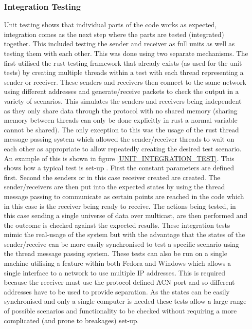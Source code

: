 \documentclass[11pt,a4paper]{article}
\begin{document}
\subsubsection{Integration Testing}
Unit testing shows that individual parts of the code works as expected, integration comes as the next step where the parts are tested (integrated) together. This included testing the sender and receiver as full units as well as testing them with each other. This was done using two separate mechanisms. The first utilised the rust testing framework that already exists (as used for the unit tests) by creating multiple threads within a test with each thread representing a sender or receiver. These senders and receivers then connect to the same network using different addresses and generate/receive packets to check the output in a variety of scenarios. This simulates the senders and receivers being independent as they only share data through the protocol with no shared memory (sharing memory between threads can only be done explicitly in rust a normal variable cannot be shared). The only exception to this was the usage of the rust thread message passing system which allowed the sender/receiver threads to wait on each other as appropriate to allow repeatedly creating the desired test scenario. An example of this is shown in figure \ref{UNIT_INTEGRATION_TEST}. This shows how a typical test is set-up . First the constant parameters are defined first. Second the senders or in this case receiver created are created. The sender/receivers are then put into the expected states by using the thread message passing to communicate as certain points are reached in the code which in this case is the receiver being ready to receive. The actions being tested, in this case sending a single universe of data over multicast, are then performed and the outcome is checked against the expected results. These integration tests mimic the real-usage of the system but with the advantage that the states of the sender/receive can be more easily synchronised to test a specific scenario using the thread message passing system. These tests can also be run on a single machine utilising a feature within both Fedora and Windows which allows a single interface to a network to use multiple IP addresses. This is required because the receiver must use the protocol defined ACN port and so different addresses have to be used to provide separation. As the states can be easily synchronised and only a single computer is needed these tests allow a large range of possible scenarios and functionality to be checked without requiring a more complicated (and prone to breakages) set-up. 
\end{document}
